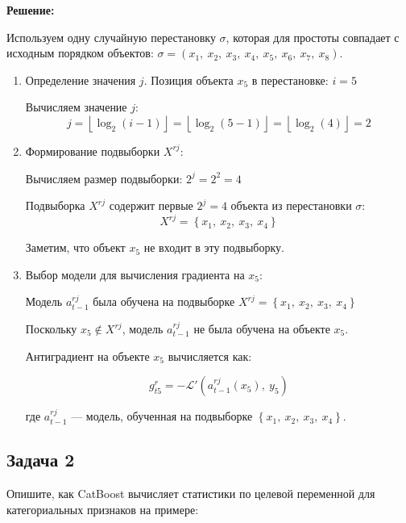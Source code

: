 \textbf{Решение:}

Используем одну случайную перестановку $\sigma$, которая для простоты совпадает с исходным порядком объектов: $\sigma = \left( x_1, \ x_2, \ x_3, \ x_4, \ x_5, \ x_6, \ x_7, \ x_8 \right)$.

\begin{enumerate}
\item  Определение значения $j$. Позиция объекта $x_5$ в перестановке: $i = 5$
   
   Вычисляем значение $j$:
   $$
   j = \left\lfloor \log_2(i - 1) \right\rfloor = \left\lfloor \log_2(5 - 1) \right\rfloor = \left\lfloor \log_2(4) \right\rfloor = 2
   $$
\item  Формирование подвыборки $X^{rj}$:

   Вычисляем размер подвыборки: $2^j = 2^2 = 4$

   Подвыборка $X^{rj}$ содержит первые $2^j = 4$ объекта из перестановки $\sigma$:
   $$
   X^{rj} = \left\{ x_1, \ x_2, \ x_3, \ x_4 \right\}
   $$

   Заметим, что объект $x_5$ не входит в эту подвыборку.
   
\item  Выбор модели для вычисления градиента на $x_5$:

   Модель $a_{t-1}^{rj}$ была обучена на подвыборке $X^{rj} = \left\{ x_1, \ x_2, \ x_3, \ x_4 \right\}$

   Поскольку $x_5 \notin X^{rj}$, модель $a_{t-1}^{rj}$ не была обучена на объекте $x_5$.

   Антиградиент на объекте $x_5$ вычисляется как:

   $$
   g_{t5}^r = -\mathcal{L}'\left( a_{t-1}^{rj}(x_5), \ y_5 \right)
   $$

   где \( a_{t-1}^{rj} \) — модель, обученная на подвыборке \( \left\{ x_1, \ x_2, \ x_3, \ x_4 \right\} \).

\end{enumerate}

\subsection*{Задача 2}

Опишите, как CatBoost вычисляет статистики по целевой переменной для категориальных признаков на примере:

